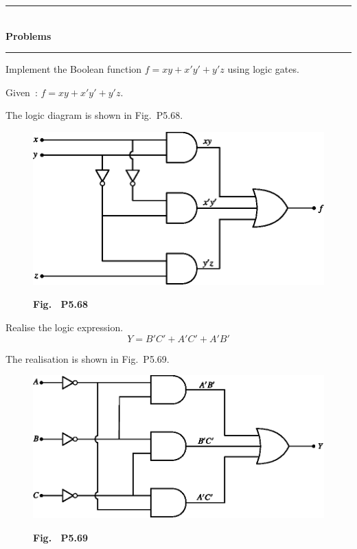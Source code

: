 \begin{center}
\rule{4cm}{1pt}\\
{\bf\Large Problems}\\[-3pt]
\rule{4cm}{1pt}
\end{center}

\begin{problem}\label{prob5.68}
Implement the Boolean function $f=xy+x'y'+y'z$ using logic gates. 
\end{problem}

\begin{solution}
Given~: $f=xy+x'y'+y'z$.

The logic diagram is shown in Fig.~P5.68.
\begin{figure}[H]
\centering
\includegraphics{chap5/figP5.65.eps}

\smallskip
{\bf Fig.~ P5.68}
\end{figure}
\end{solution}

\begin{problem}\label{prob5.69}
Realise the logic expression.
$$
Y=B'C'+A'C'+A'B'
$$
\end{problem}

\eject

\begin{solution}
The realisation is shown in Fig.~P5.69.
\begin{figure}[H]
\centering
\includegraphics{chap5/figP5.66.eps}

\smallskip
{\bf Fig.~ P5.69}
\end{figure}
\end{solution}


